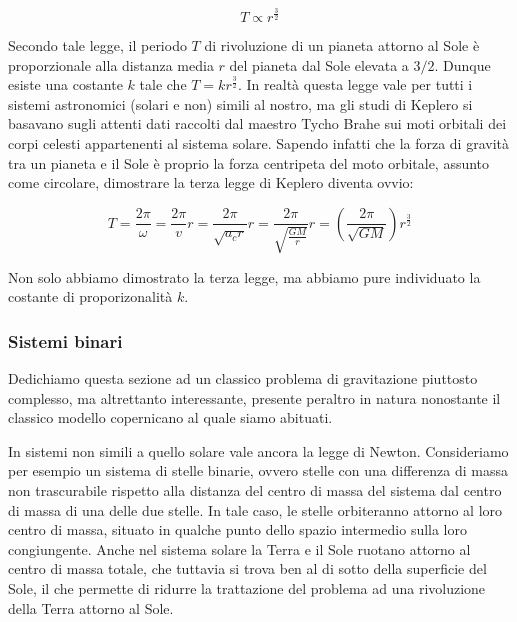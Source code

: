 \[ T \propto r^\frac{3}{2} \]

\noindent Secondo tale legge, il periodo $T$ di rivoluzione di un pianeta attorno al Sole
è proporzionale alla distanza media $r$ del pianeta dal Sole elevata a $3/2$. Dunque esiste
una costante $k$ tale che $T = kr^\frac{3}{2}$. In realtà
questa legge vale per tutti i sistemi astronomici (solari e non) simili al nostro, ma
gli studi di Keplero si basavano sugli attenti dati raccolti dal maestro Tycho Brahe
sui moti orbitali dei corpi celesti appartenenti al sistema solare.
Sapendo infatti che la forza di gravità tra un pianeta e il Sole è proprio la forza
centripeta del moto orbitale, assunto come circolare, dimostrare la terza legge di
Keplero diventa ovvio:

\[ T = \frac{2\pi}{\omega} = \frac{2\pi}{v}r = \frac{2\pi}{\sqrt{a_c r}}r = \frac{2\pi}{\sqrt{\frac{GM}{r}}}r = \left(\frac{2\pi}{\sqrt{GM}}\right)r^\frac{3}{2} \]

\noindent Non solo abbiamo dimostrato la terza legge, ma abbiamo pure individuato la
costante di proporizonalità $k$.

\subsubsection*{Sistemi binari}
Dedichiamo questa sezione ad un classico problema di gravitazione piuttosto complesso,
ma altrettanto interessante, presente peraltro in natura nonostante il classico
modello copernicano al quale siamo abituati.

In sistemi non simili a quello solare vale ancora la legge di Newton. Consideriamo
per esempio un sistema di stelle binarie, ovvero stelle con una differenza di massa
non trascurabile rispetto alla distanza del centro di massa del sistema dal centro
di massa di una delle due stelle. In tale caso, le stelle orbiteranno attorno al
loro centro di massa, situato in qualche punto dello spazio intermedio sulla loro
congiungente. Anche nel sistema solare la Terra e il Sole ruotano attorno al centro
di massa totale, che tuttavia si trova ben al di sotto della superficie del Sole,
il che permette di ridurre la trattazione del problema ad una rivoluzione della
Terra attorno al Sole.